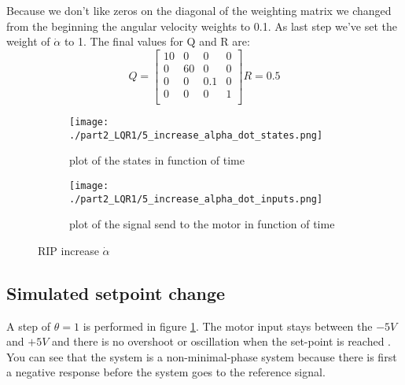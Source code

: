 Because we don't like zeros on the diagonal of the weighting matrix we changed from the beginning the angular velocity weights to 0.1. As last step we've set the weight of $\dot{\alpha}$ to 1. The final values for Q and R are:
$$
Q=\begin{bmatrix}
10 & 0 & 0 & 0 \\
0 & 60 & 0 & 0 \\
0 & 0 & 0.1 & 0 \\
0 & 0 & 0 & 1 \\
\end{bmatrix}
R=0.5
$$

\begin{figure}[H]
	\centering
	\begin{subfigure}[b]{0.45\textwidth}
		\texttt{[image: ./part2\_LQR1/5\_increase\_alpha\_dot\_states.png]}
		\caption{plot of the states in function of time}
	\end{subfigure}
	\begin{subfigure}[b]{0.45\textwidth}
		\texttt{[image: ./part2\_LQR1/5\_increase\_alpha\_dot\_inputs.png]}
		\caption{plot of the signal send to the motor in function of time}
	\end{subfigure}
	\caption{RIP increase $\dot{\alpha}$}
	\label{fig:last_sim_3}
\end{figure}




\subsection{Simulated setpoint change}

A step of $\theta = 1$ is performed in figure \ref{fig:last_sim_3}. The motor input stays between the $-5V$ and $+5V$ and there is no overshoot or oscillation when the set-point is reached . You can see that the system is a non-minimal-phase system because there is first a negative response before the system goes to the reference signal.